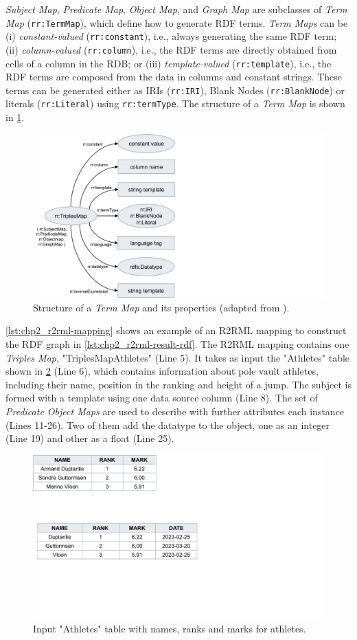\textit{Subject Map}, \textit{Predicate Map}, \textit{Object Map}, and \textit{Graph Map} are subclasses of \textit{Term Map} (\texttt{rr:TermMap}), which define how to generate RDF terms. 
\textit{Term Maps} can be (i) \textit{constant-valued} (\texttt{rr:constant}), i.e., always generating the same RDF term; 
(ii) \textit{column-valued} (\texttt{rr:column}), i.e., the RDF terms are directly obtained from cells of a column in the RDB; 
or (iii) \textit{template-valued} (\texttt{rr:template}), i.e., the RDF terms are composed from the data in columns and constant strings. These terms can be generated either as IRIs (\texttt{rr:IRI}), Blank Nodes (\texttt{rr:BlankNode}) or literals (\texttt{rr:Literal}) using \texttt{rr:termType}. The structure of a \textit{Term Map} is shown in \cref{fig:chp2_r2rml-term}.


\begin{figure}[t]
\centering
\includegraphics[width=0.45\linewidth]{figures/chp2_r2rml_term.pdf}
\caption[Structure of Triples Map from R2RML]{Structure of a \textit{Term Map} and its properties (adapted from \cite{das2012r2rml}).}
\label{fig:chp2_r2rml-term}
\end{figure}



\cref{lst:chp2_r2rml-mapping} shows an example of an R2RML mapping to construct the RDF graph in \cref{lst:chp2_r2rml-result-rdf}. The R2RML mapping contains one \textit{Triples Map}, "TriplesMapAthletes" (Line 5). It takes as input the "Athletes" table shown in \cref{fig:chp2_database-example} (Line 6), which contains information about pole vault athletes, including their name, position in the ranking and height of a jump. The subject is formed with a template using one data source column (Line 8). The set of \textit{Predicate Object Maps} are used to describe with further attributes each instance (Lines 11-26). Two of them add the datatype to the object, one as an integer (Line 19) and other as a float (Line 25). 


\begin{figure}[h]
\centering
\includegraphics[width=0.45\linewidth]{figures/chp2_database-example.pdf}
\caption[Input "Athletes" table]{Input "Athletes" table with names, ranks and marks for athletes.}
\label{fig:chp2_database-example}
\end{figure}


